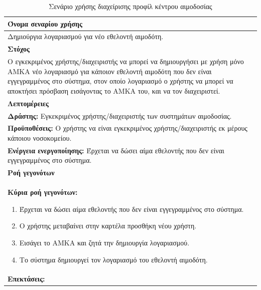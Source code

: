\begin{table}[H]
	\begin{center}
	    \begin{tabular}{|p{\dimexpr \linewidth-2\tabcolsep}|}
	    \hline
	    \rowcolor{grayy}
	    \textbf{Όνομα σεναρίου χρήσης}
	    \\ \hline    
	    Δημιούργια λογαριασμού για νέο εθελοντή αιμοδότη.
	     \\ \hline
	    \rowcolor{grayy}
	    \textbf{\textbf{Στόχος}}
	    \\ \hline
	 	 Ο εγκεκριμένος χρήστης/διαχειριστής να μπορεί να δημιουργήσει με χρήση μόνο ΑΜΚΑ νέο λογαριασμό για κάποιον εθελοντή αιμοδότη που δεν είναι εγγεγραμμένος στο σύστημα, στον οποίο λογαριασμό ο χρήστης να μπορεί να αποκτήσει πρόσβαση εισάγοντας το ΑΜΚΑ του, και να τον διαχειριστεί.
	    \\ \hline
	    \rowcolor{grayy}
	    \textbf{Λεπτομέρειες}
	    \\ \hline
		\textbf{Δράστης:} Εγκεκριμένος χρήστης/διαχειριστής των συστημάτων αιμοδοσίας.
		\\*
		\textbf{Προϋποθέσεις:} Ο χρήστης να είναι εγκεκριμένος χρήστης/διαχειριστής εκ μέρους κάποιου νοσοκομείου.
		\\*
		\textbf{Ενέργεια ενεργοποίησης:} Έρχεται να δώσει αίμα εθελοντής που δεν είναι εγγεγραμμένος στο σύστημα.
		\\ \hline
		\rowcolor{grayy}    
	    \textbf{Ροή γεγονότων}
	    \\ \hline
		\textbf{Κύρια ροή γεγονότων:}
		\begin{enumerate}
			\item	 Έρχεται να δώσει αίμα εθελοντής που δεν είναι εγγεγραμμένος στο σύστημα.
			\item Ο χρήστης μεταβαίνει στην καρτέλα προσθήκη νέου χρήστη.
			\item Εισάγει το ΑΜΚΑ και ζητά την δημιουργία λογαριασμού.
			\item Το σύστημα δημιουργεί τον λογαριασμό του εθελοντή αιμοδότη.
		\end{enumerate}
		\\ \hline
		\rowcolor{grayy}
		\textbf{Επεκτάσεις:}
		   \\ \hline
	    \end{tabular}
	    \caption{Σενάριο χρήσης διαχείρισης προφίλ κέντρου αιμοδοσίας}
	    \label{tab:create_new_donor_account}
	\end{center}
\end{table}	


